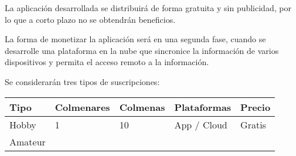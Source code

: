 La aplicación desarrollada se distribuirá de forma gratuita y sin
publicidad, por lo que a corto plazo no se obtendrán beneficios.

La forma de monetizar la aplicación será en una segunda fase, cuando se
desarrolle una plataforma en la nube que sincronice la información de
varios dispositivos y permita el acceso remoto a la información.

Se considerarán tres tipos de suscripciones:

\begin{longtable}[]{@{}lllll@{}}
\toprule
\begin{minipage}[b]{0.16\columnwidth}\raggedright\strut
\textbf{Tipo}\strut
\end{minipage} & \begin{minipage}[b]{0.19\columnwidth}\raggedright\strut
\textbf{Colmenares}\strut
\end{minipage} & \begin{minipage}[b]{0.17\columnwidth}\raggedright\strut
\textbf{Colmenas}\strut
\end{minipage} & \begin{minipage}[b]{0.20\columnwidth}\raggedright\strut
\textbf{Plataformas}\strut
\end{minipage} & \begin{minipage}[b]{0.15\columnwidth}\raggedright\strut
\textbf{Precio}\strut
\end{minipage}\tabularnewline
\midrule
\endhead
\begin{minipage}[t]{0.16\columnwidth}\raggedright\strut
Hobby\strut
\end{minipage} & \begin{minipage}[t]{0.19\columnwidth}\raggedright\strut
1\strut
\end{minipage} & \begin{minipage}[t]{0.17\columnwidth}\raggedright\strut
10\strut
\end{minipage} & \begin{minipage}[t]{0.20\columnwidth}\raggedright\strut
App / Cloud\strut
\end{minipage} & \begin{minipage}[t]{0.15\columnwidth}\raggedright\strut
Gratis\strut
\end{minipage}\tabularnewline
\begin{minipage}[t]{0.16\columnwidth}\raggedright\strut
Amateur\strut
\end{minipage} & \begin{minipage}[t]{0.19\columnwidth}\raggedright\strut

\end{minipage}
\end{longtable}
